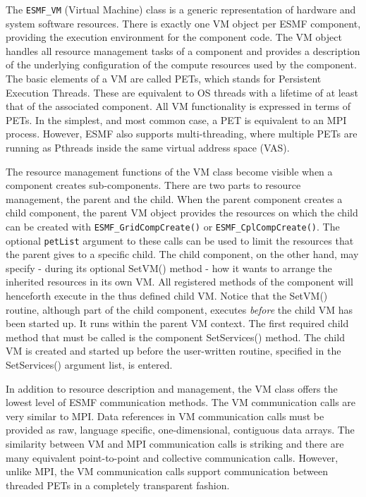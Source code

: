 
The {\tt ESMF\_VM} (Virtual Machine) class is a generic representation of hardware and system software resources. There is exactly one VM object per ESMF component, providing the execution environment for the component code. The VM object handles all resource management tasks of a component and provides a description of the underlying configuration of the compute resources used by the component. The basic elements of a VM are called PETs, which stands for Persistent Execution Threads.  These are equivalent to OS threads with a lifetime of at least that of the associated component. All VM functionality is expressed in terms of PETs. In the simplest, and most common case, a PET is equivalent to an MPI process. However, ESMF also supports multi-threading, where multiple PETs are running as Pthreads inside the same virtual address space (VAS).

The resource management functions of the VM class become visible when a component creates sub-components. There are two parts to resource management, the parent and the child. When the parent component creates a child component, the parent VM object provides the resources on which the child can be created with {\tt ESMF\_GridCompCreate()} or {\tt ESMF\_CplCompCreate()}. The optional {\tt petList} argument to these calls can be used to limit the resources that the parent gives to a specific child. The child component, on the other hand, may specify - during its optional SetVM() method - how it wants to arrange the inherited resources in its own VM. All registered methods of the component will henceforth execute in the thus defined child VM. Notice that the SetVM() routine, although part of the child component, executes {\em before} the child VM has been started up. It runs within the parent VM context. The first required child method that must be called is the component SetServices() method. The child VM is created and started up before the user-written routine, specified in the SetServices() argument list, is entered.

In addition to resource description and management, the VM class offers the lowest level of ESMF communication methods. The VM communication calls are very similar to MPI. Data references in VM communication calls must be provided as raw, language specific, one-dimensional, contiguous data arrays. The similarity between VM and MPI communication calls is striking and there are many equivalent point-to-point and collective communication calls. However, unlike MPI, the VM communication calls support communication between threaded PETs in a completely transparent fashion.
